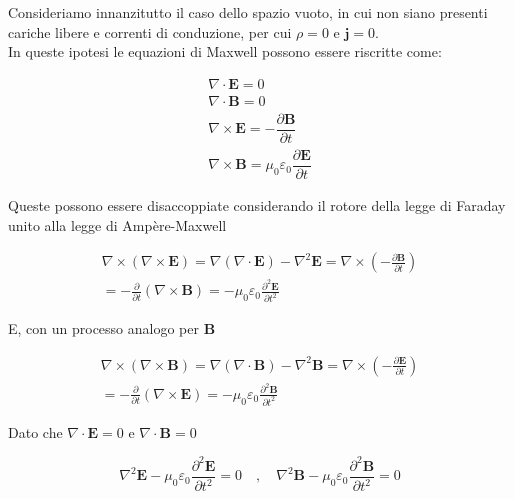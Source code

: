 Consideriamo innanzitutto il caso dello spazio vuoto, in cui non siano presenti cariche libere e correnti di conduzione, per cui $\rho = 0$ e $\mathbf{j} = 0$. \\

In queste ipotesi le equazioni di Maxwell possono essere riscritte come:

\begin{align*}
    \nabla \cdot \mathbf{E} = 0 \\
    \nabla \cdot \mathbf{B} = 0 \\
    \nabla \times \mathbf{E} = -\dfrac{\partial \mathbf{B}}{\partial t} \\
    \nabla \times \mathbf{B} = \mu_0 \varepsilon_0 \dfrac{\partial \mathbf{E}}{\partial t}
\end{align*}

Queste possono essere disaccoppiate considerando il rotore della legge di Faraday unito alla legge di Ampère-Maxwell

\begin{align*}
    \nabla \times (\nabla \times \mathbf{E}) = \nabla (\nabla \cdot \mathbf{E}) - \nabla^2 \mathbf{E} = \nabla \times \left( - \frac{\partial \mathbf{B}}{\partial t} \right)\\
    = - \frac{\partial}{\partial t} (\nabla \times \mathbf{B}) = - \mu_0 \varepsilon_0 \frac{\partial^2 \mathbf{E}}{\partial t^2}
\end{align*}

E, con un processo analogo per $\mathbf{B}$

\begin{align*}
    \nabla \times (\nabla \times \mathbf{B}) = \nabla (\nabla \cdot \mathbf{B}) - \nabla^2 \mathbf{B} = \nabla \times \left( - \frac{\partial \mathbf{E}}{\partial t} \right)\\
    = - \frac{\partial}{\partial t} (\nabla \times \mathbf{E}) = - \mu_0 \varepsilon_0 \frac{\partial^2 \mathbf{B}}{\partial t^2}
\end{align*}

Dato che $\nabla \cdot \mathbf{E} = 0$ e $\nabla \cdot \mathbf{B} = 0$

\begin{tcolorbox}[colback=yellow!10!white, colframe=orange!70!black, boxrule=0.8pt]
\begin{equation} \label{eq: eq_onda_elettromagnetismo}
    \nabla^2 \mathbf{E} - \mu_0 \varepsilon_0 \frac{\partial^2 \mathbf{E}}{\partial t^2} = 0 \quad , \quad \nabla^2 \mathbf{B} - \mu_0 \varepsilon_0 \frac{\partial^2 \mathbf{B}}{\partial t^2} = 0
\end{equation}
\end{tcolorbox}

